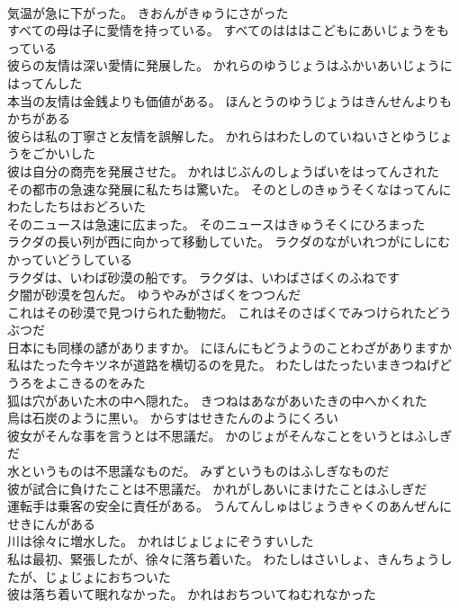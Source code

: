 \documentclass[8pt]{extreport}
\begin{document}
\begin{CJK}{UTF8}{min}
\\	気温が急に下がった。	きおんがきゅうにさがった 
\\	すべての母は子に愛情を持っている。	すべてのはははこどもにあいじょうをもっている 
\\	彼らの友情は深い愛情に発展した。	かれらのゆうじょうはふかいあいじょうにはってんした 
\\	本当の友情は金銭よりも価値がある。	ほんとうのゆうじょうはきんせんよりもかちがある 
\\	彼らは私の丁寧さと友情を誤解した。	かれらはわたしのていねいさとゆうじょうをごかいした 
\\	彼は自分の商売を発展させた。	かれはじぶんのしょうばいをはってんされた 
\\	その都市の急速な発展に私たちは驚いた。	そのとしのきゅうそくなはってんにわたしたちはおどろいた 
\\	そのニュースは急速に広まった。	そのニュースはきゅうそくにひろまった 
\\	ラクダの長い列が西に向かって移動していた。	ラクダのながいれつがにしにむかっていどうしている 
\\	ラクダは、いわば砂漠の船です。	ラクダは、いわばさばくのふねです 
\\	夕闇が砂漠を包んだ。	ゆうやみがさばくをつつんだ 
\\	これはその砂漠で見つけられた動物だ。	これはそのさばくでみつけられたどうぶつだ 
\\	日本にも同様の諺がありますか。	にほんにもどうようのことわざがありますか 
\\	私はたった今キツネが道路を横切るのを見た。	わたしはたったいまきつねげどうろをよこきるのをみた 
\\	狐は穴があいた木の中へ隠れた。	きつねはあながあいたきの中へかくれた 
\\	烏は石炭のように黒い。	からすはせきたんのようにくろい 
\\	彼女がそんな事を言うとは不思議だ。	かのじょがそんなことをいうとはふしぎだ 
\\	水というものは不思議なものだ。	みずというものはふしぎなものだ 
\\	彼が試合に負けたことは不思議だ。	かれがしあいにまけたことはふしぎだ 
\\	運転手は乗客の安全に責任がある。	うんてんしゅはじょうきゃくのあんぜんにせきにんがある 
\\	川は徐々に増水した。	かれはじょじょにぞうすいした 
\\	私は最初、緊張したが、徐々に落ち着いた。	わたしはさいしょ、きんちょうしたが、じょじょにおちついた 
\\	彼は落ち着いて眠れなかった。	かれはおちついてねむれなかった 

\end{CJK}
\end{document}

